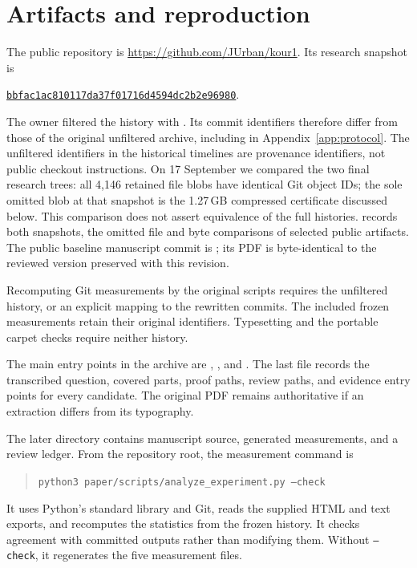 \section{Artifacts and reproduction}
\label{app:reproduction}

The public repository is \url{https://github.com/JUrban/kour1}.
Its research snapshot is
\begin{center}\small
\href{https://github.com/JUrban/kour1/tree/bbfac1ac810117da37f01716d4594dc2b2e96980}{\texttt{bbfac1ac810117da37f01716d4594dc2b2e96980}}.
\end{center}
The owner filtered the history with
. Its commit identifiers therefore
differ from those of the original unfiltered archive, including
\snapshot{} in Appendix~\ref{app:protocol}. The unfiltered identifiers
in the historical timelines are provenance identifiers, not public
checkout instructions. On 17 September we compared the two final research
trees: all 4,146 retained file blobs have identical Git object IDs;
the sole omitted blob at that snapshot is the 1.27\,GB compressed
 certificate discussed below. This comparison does not
assert equivalence of the full histories.
 records both snapshots,
the omitted file and byte comparisons of selected public artifacts.
The public baseline manuscript commit is
; its PDF is byte-identical
to the reviewed version preserved with this revision.

Recomputing Git measurements by the original scripts requires the
unfiltered history, or an explicit mapping to the rewritten commits.
The included frozen measurements retain their original identifiers.
Typesetting and the portable carpet checks require neither history.

The main entry points in the archive are
,
, and
.
The last file records the transcribed question, covered
parts, proof paths, review paths, and evidence entry
points for every candidate. The original PDF remains
authoritative if an extraction differs from its typography.

The later  directory contains manuscript
source, generated measurements, and a review ledger.
From the repository root, the measurement command is
\begin{quote}\small
\texttt{python3 paper/scripts/analyze\_experiment.py --check}
\end{quote}
It uses Python's standard library and Git, reads the
supplied HTML and text exports, and recomputes the
statistics from the frozen history. It checks agreement
with committed outputs rather than modifying them.
Without \texttt{--check}, it regenerates the five
measurement files.

